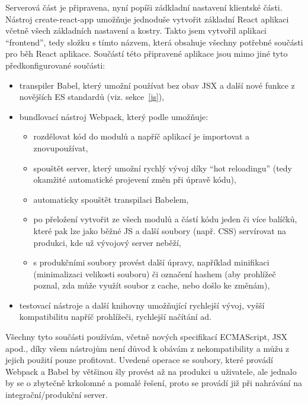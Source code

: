     Serverová část je připravena, nyní popíši zádkladní nastavení klientské části. Nástroj create-react-app umožňuje jednoduše vytvořit základní React aplikaci včetně všech základních nastavení a kostry. Takto jsem vytvořil aplikaci \enquote{frontend}, tedy složku s tímto názvem, která obsahuje všechny potřebné součásti pro běh React aplikace. Součástí této připravené aplikace jsou mimo jiné tyto předkonfigurované součásti:
    \begin{itemize}
        \item transpiler Babel, který umožní používat bez obav JSX a další nové funkce z novějších ES standardů (viz. sekce~\ref{js}),
        \item bundlovací nástroj Webpack, který podle \cite{webpack-ackee} umožňuje:
            \begin{itemize}
                \item rozdělovat kód do modulů a napříč aplikací je importovat a znovupoužívat,
                \item spouštět server, který umožní rychlý vývoj díky \enquote{hot reloadingu} (tedy okamžité automatické projevení změn při úpravě kódu),
                \item automaticky spouštět transpilaci Babelem,
                \item po přeložení vytvořit ze všech modulů a částí kódu jeden či více balíčků, které pak lze jako běžné JS a další soubory (např. CSS) servírovat na produkci, kde už vývojový server neběží,
                \item s produkčními soubory provést další úpravy, například minifikaci (minimalizaci velikosti souboru) či označení hashem (aby prohlížeč poznal, zda může využít soubor z cache, nebo došlo ke změnám),
            \end{itemize}
        \item testovací nástroje a další knihovny umožňující rychlejší vývoj, vyšší kompatibilitu napříč prohlížeči, rychlejší načítání ad.
    \end{itemize}
    Všechny tyto součásti používám, včetně nových specifikací ECMAScript, JSX apod., díky všem nástrojům není důvod k obávám z nekompatibility a můžu z jejich použití pouze profitovat. Uvedené operace se soubory, které provádí Webpack a Babel by většinou šly provést až na produkci u uživatele, ale jednalo by se o zbytečně krkolomné a pomalé řešení, proto se provádí již při nahrávání na integrační/produkční server.
    
